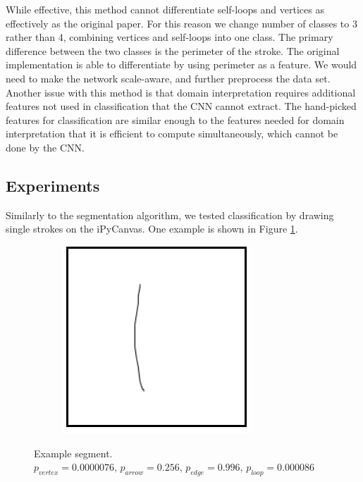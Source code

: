 While effective, this method cannot differentiate self-loops and vertices as effectively as the original paper. For this reason we change number of classes to 3 rather than 4, combining vertices and self-loops into one class. The primary difference between the two classes is the perimeter of the stroke. The original implementation is able to differentiate by using perimeter as a feature. We would need to make the network scale-aware, and further preprocess the data set. \\

Another issue with this method is that domain interpretation requires additional features not used in classification that the CNN cannot extract. The hand-picked features for classification are similar enough to the features needed for domain interpretation that it is efficient to compute simultaneously, which cannot be done by the CNN.

\subsection{Experiments}
Similarly to the segmentation algorithm, we tested classification by drawing single strokes on the iPyCanvas. One example is shown in Figure \ref{fig:classification_example}.

\begin{figure}
	\centering
	\begin{subfigure}{0.9\textwidth}
		\centering
		\includegraphics[scale=0.5]{./img/classificationexample}
	\end{subfigure}
	\caption{Example segment. $p_{vertex} = 0.0000076\text{, }   p_{arrow} = 0.256\text{, } p_{edge} = 0.996\text{, }  p_{loop} = 0.000086$}
	\label{fig:classification_example}
\end{figure}

%
%


